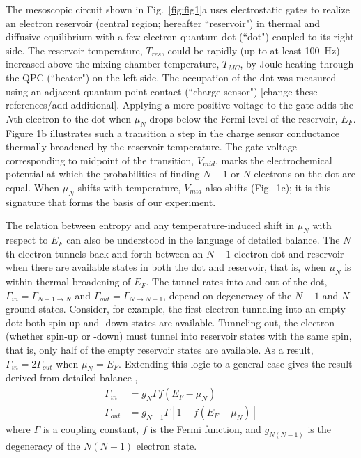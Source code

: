 \documentclass[twocolumn,showpacs,amsmath,amssymb,prl,aps,superscriptaddress]{revtex4-1}
\begin{document}
The mesoscopic circuit shown in Fig.~\ref{fig:fig1}a uses electrostatic gates to realize an electron reservoir (central region; hereafter ``reservoir") in thermal and diffusive equilibrium with a few-electron quantum dot (``dot") coupled to its right side.  The reservoir temperature, $T_{res}$, could be rapidly (up to at least \SI{100}{\hertz}) increased above the mixing chamber temperature, $T_{MC}$, by Joule heating through the QPC (``heater") on the left side.  The occupation of the dot was measured using an adjacent quantum point contact (``charge sensor")\cite{Staring2007, Thierschmann2015} [change these references/add additional].  Applying a more positive voltage to the gate adds the $N$th electron to the dot when $\mu_{N}$ drops below the Fermi level of the reservoir, $E_F$. Figure 1b illustrates such a transition \textemdash a step in the charge sensor conductance \textemdash thermally broadened by the reservoir temperature.  The gate voltage corresponding to midpoint of the transition, $V_{mid}$, marks the electrochemical potential at which the probabilities of finding $N-1$ or $N$ electrons on the dot are equal.  When $\mu_N$ shifts with temperature, $V_{mid}$ also shifts (Fig.~1c); it is this signature that forms the basis of our experiment.%

The relation between entropy and any temperature-induced shift in $\mu_{N}$ with respect to $E_F$ can also be understood in the language of detailed balance.  The $N$th electron tunnels back and forth between an $N-1$-electron dot and reservoir when there are available states in both the dot and reservoir, that is, when $\mu_{N}$ is within thermal broadening of $E_F$.  The tunnel rates into and out of the dot, $\Gamma_{in}=\Gamma_{N-1\rightarrow N}$ and $\Gamma_{out}=\Gamma_{N\rightarrow N-1}$, depend on degeneracy of the $N-1$ and $N$ ground states.  %
Consider, for example, the first electron tunneling into an empty dot: both spin-up and -down states are available.  Tunneling out, the electron (whether spin-up or -down) must tunnel into reservoir states with the same spin, that is, only half of the empty reservoir states are available.  As a result, $\Gamma_{in} = 2\Gamma_{out}$ when $\mu_{N}=E_F$.  Extending this logic to a general case gives the result derived from detailed balance \cite{Gustavsson2009, Beenakker1991}, 
%
\begin{align}
	\Gamma_{in} &=  g_{N} \Gamma f(E_F - \mu_{N}) \nonumber \\
	\Gamma_{out} &= g_{N-1} \Gamma [1 - f(E_F - \mu_{N})] \label{eqn:rates}
\end{align}
%
where $\Gamma$ is a coupling constant, $f$ is the Fermi function, and $g_{N(N-1)}$ is the degeneracy of the $N(N-1)$ electron state.
\end{document}
